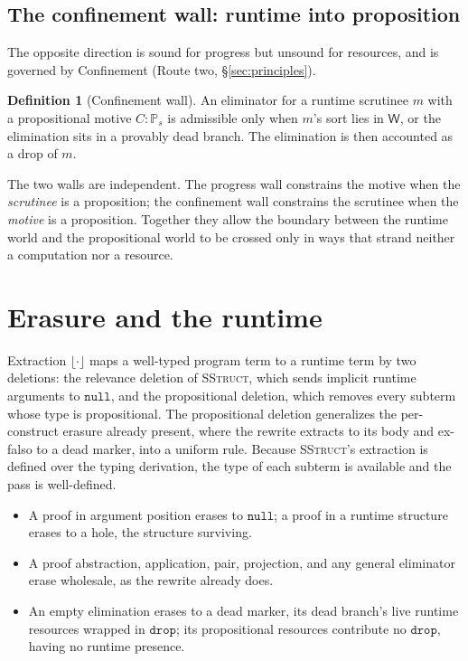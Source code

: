 \documentclass[11pt]{article}
\newcommand{\Wk}{\mathsf{W}}
\newcommand{\Prop}[1]{\mathbb{P}_{#1}}            %
\newcommand{\erase}[1]{\lfloor #1 \rfloor}
\newcommand{\nul}{\mathtt{null}}
\newcommand{\drp}{\mathtt{drop}}
\theoremstyle{definition}
\newtheorem{definition}{Definition}[section]
\theoremstyle{plain}
\begin{document}
\subsection{The confinement wall: runtime into proposition}

The opposite direction is sound for progress but unsound for resources, and is
governed by Confinement (Route two, \S\ref{sec:principles}).

\begin{definition}[Confinement wall]\label{def:confine}
An eliminator for a runtime scrutinee $m$ with a propositional motive
$C:\Prop{s}$ is admissible only when $m$'s sort lies in $\Wk$, or the elimination
sits in a provably dead branch. The elimination is then accounted as a drop of
$m$.
\end{definition}

The two walls are independent. The progress wall constrains the motive when the
\emph{scrutinee} is a proposition; the confinement wall constrains the scrutinee
when the \emph{motive} is a proposition. Together they allow the boundary between
the runtime world and the propositional world to be crossed only in ways that
strand neither a computation nor a resource.

\section{Erasure and the runtime}\label{sec:erasure}

Extraction $\erase{\cdot}$ maps a well-typed program term to a runtime term by
two deletions: the relevance deletion of \textsc{SStruct}, which sends implicit
runtime arguments to $\nul$, and the propositional deletion, which removes every
subterm whose type is propositional. The propositional deletion generalizes the
per-construct erasure already present, where the rewrite extracts to its body and
ex-falso to a dead marker, into a uniform rule. Because \textsc{SStruct}'s
extraction is defined over the typing derivation, the type of each subterm is
available and the pass is well-defined.

\begin{itemize}
\item A proof in argument position erases to $\nul$; a proof in a runtime
structure erases to a hole, the structure surviving.
\item A proof abstraction, application, pair, projection, and any general
eliminator erase wholesale, as the rewrite already does.
\item An empty elimination erases to a dead marker, its dead branch's live
runtime resources wrapped in $\drp$; its propositional resources contribute no
$\drp$, having no runtime presence.
\end{itemize}
\end{document}
